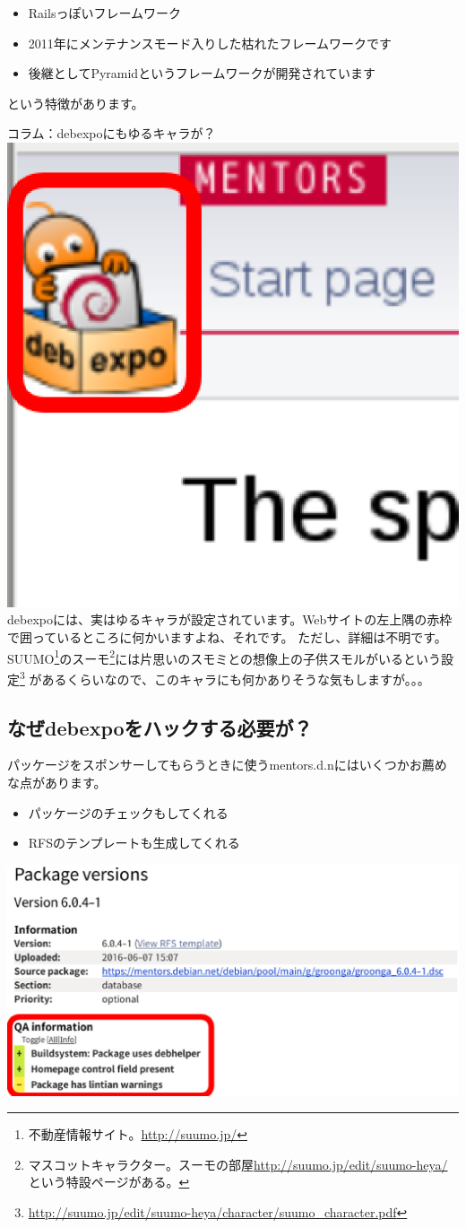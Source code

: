 \documentclass[mingoth,a4paper]{jsarticle}
\begin{document}
\begin{itemize}
\item Railsっぽいフレームワーク
\item 2011年にメンテナンスモード入りした枯れたフレームワークです
\item 後継としてPyramidというフレームワークが開発されています
\end{itemize}

という特徴があります。

\begin{itembox}[l]{コラム：debexpoにもゆるキャラが？}
\includegraphics[width=0.2\hsize]{image201606/debexpo-mascot-zoom.eps}
debexpoには、実はゆるキャラが設定されています。Webサイトの左上隅の赤枠で囲っているところに何かいますよね、それです。
ただし、詳細は不明です。SUUMO\footnote{不動産情報サイト。\url{http://suumo.jp/}}のスーモ\footnote{マスコットキャラクター。スーモの部屋\url{http://suumo.jp/edit/suumo-heya/}という特設ページがある。}には片思いのスモミとの想像上の子供スモルがいるという設定\footnote{\url{http://suumo.jp/edit/suumo-heya/character/suumo_character.pdf}}
があるくらいなので、このキャラにも何かありそうな気もしますが。。。
\end{itembox}

\subsection{なぜdebexpoをハックする必要が？}

パッケージをスポンサーしてもらうときに使うmentors.d.nにはいくつかお薦めな点があります。

\begin{itemize}
  \item パッケージのチェックもしてくれる
  \item RFSのテンプレートも生成してくれる
\end{itemize}

\begin{screen}
  \includegraphics[width=0.8\hsize]{image201606/qa-information.eps}
\end{screen}
\end{document}

